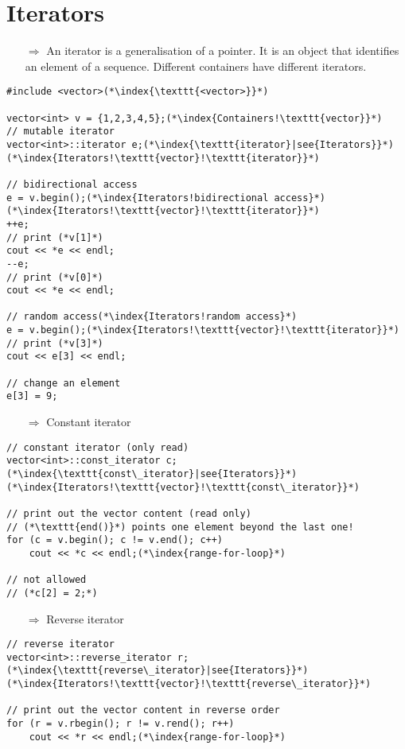 \documentclass[10pt]{book}
\begin{document}
\section{Iterators}
\begin{enumerate}
\item[$\Rightarrow$] An iterator is a generalisation of a pointer. It is an object that identifies an element of a sequence. Different containers have
different iterators.
\end{enumerate}
\begin{lstlisting}
#include <vector>(*\index{\texttt{<vector>}}*)

vector<int> v = {1,2,3,4,5};(*\index{Containers!\texttt{vector}}*)
// mutable iterator
vector<int>::iterator e;(*\index{\texttt{iterator}|see{Iterators}}*)(*\index{Iterators!\texttt{vector}!\texttt{iterator}}*)

// bidirectional access
e = v.begin();(*\index{Iterators!bidirectional access}*)(*\index{Iterators!\texttt{vector}!\texttt{iterator}}*)
++e;
// print (*v[1]*)
cout << *e << endl;
--e;
// print (*v[0]*)
cout << *e << endl;

// random access(*\index{Iterators!random access}*)
e = v.begin();(*\index{Iterators!\texttt{vector}!\texttt{iterator}}*)
// print (*v[3]*)
cout << e[3] << endl;

// change an element
e[3] = 9;
\end{lstlisting}
\begin{enumerate}
\item[$\Rightarrow$] Constant iterator
\end{enumerate}
\begin{lstlisting}
// constant iterator (only read)
vector<int>::const_iterator c;(*\index{\texttt{const\_iterator}|see{Iterators}}*)(*\index{Iterators!\texttt{vector}!\texttt{const\_iterator}}*)

// print out the vector content (read only)
// (*\texttt{end()}*) points one element beyond the last one!
for (c = v.begin(); c != v.end(); c++)
    cout << *c << endl;(*\index{range-for-loop}*)

// not allowed
// (*c[2] = 2;*)
\end{lstlisting}
\begin{enumerate}
\item[$\Rightarrow$] Reverse iterator
\end{enumerate}
\begin{lstlisting}
// reverse iterator
vector<int>::reverse_iterator r;(*\index{\texttt{reverse\_iterator}|see{Iterators}}*)(*\index{Iterators!\texttt{vector}!\texttt{reverse\_iterator}}*)

// print out the vector content in reverse order
for (r = v.rbegin(); r != v.rend(); r++)
    cout << *r << endl;(*\index{range-for-loop}*)
\end{lstlisting}
\end{document}
